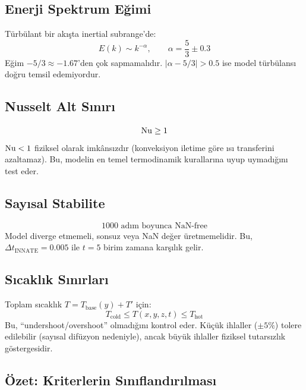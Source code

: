 \subsection{Enerji Spektrum Eğimi}

Türbülant bir akışta inertial subrange'de:
\begin{equation}
    E(k) \sim k^{-\alpha}, \qquad \alpha = \frac{5}{3} \pm 0.3
    \label{eq:spectrum_slope}
\end{equation}
Eğim $-5/3 \approx -1.67$'den çok sapmamalıdır. $|\alpha - 5/3| > 0.5$ ise model türbülansı doğru temsil edemiyordur.

\subsection{Nusselt Alt Sınırı}

\begin{equation}
    \mathrm{Nu} \geq 1
    \label{eq:nusselt_bound}
\end{equation}
$\mathrm{Nu} < 1$ fiziksel olarak imkânsızdır (konveksiyon iletime göre ısı transferini azaltamaz). Bu, modelin en temel termodinamik kurallarına uyup uymadığını test eder.

\subsection{Sayısal Stabilite}

\begin{equation}
    \text{1000 adım boyunca NaN-free}
    \label{eq:stability}
\end{equation}
Model diverge etmemeli, sonsuz veya NaN değer üretmemelidir. Bu, $\Delta t_{\text{INNATE}} = 0.005$ ile $t = 5$ birim zamana karşılık gelir.

\subsection{Sıcaklık Sınırları}

Toplam sıcaklık $T = T_{\text{base}}(y) + T'$ için:
\begin{equation}
    T_{\text{cold}} \leq T(x,y,z,t) \leq T_{\text{hot}}
    \label{eq:temp_bounds}
\end{equation}
Bu, ``undershoot/overshoot'' olmadığını kontrol eder. Küçük ihlaller ($\pm 5\%$) tolere edilebilir (sayısal difüzyon nedeniyle), ancak büyük ihlaller fiziksel tutarsızlık göstergesidir.

\subsection{Özet: Kriterlerin Sınıflandırılması}


